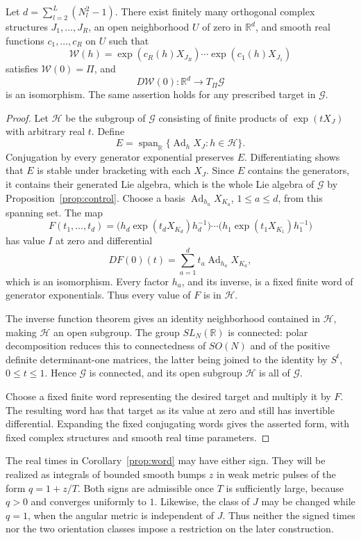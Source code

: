 \begin{corollary}
\label{prop:word}
Let \(d=\sum_{l=2}^L(N_l^2-1)\).
There exist finitely many orthogonal complex structures
\(J_1,\ldots,J_R\), an open neighborhood \(U\) of zero in
\(\mathbb R^d\), and smooth real functions \(c_1,\ldots,c_R\) on
\(U\) such that
\[
 \mathcal W(h)=
   \exp(c_R(h)X_{J_R})\cdots\exp(c_1(h)X_{J_1})
\]
satisfies \(\mathcal W(0)=\Pi\), and
\[
 D\mathcal W(0):\mathbb R^d\longrightarrow T_\Pi\mathcal G
\]
is an isomorphism.  The same assertion holds for any prescribed
target in \(\mathcal G\).
\end{corollary}

\begin{proof}
Let \(\mathcal H\) be the subgroup of \(\mathcal G\) consisting of
finite products of \(\exp(tX_J)\) with arbitrary real \(t\).  Define
\[
 E=\operatorname{span}_{\mathbb R}
       \{\operatorname{Ad}_hX_J:h\in\mathcal H\}.
\]
Conjugation by every generator exponential preserves \(E\).
Differentiating shows that \(E\) is stable under bracketing with
each \(X_J\).  Since \(E\) contains the generators, it contains
their generated Lie algebra, which is the whole Lie algebra of
\(\mathcal G\) by Proposition~\ref{prop:control}.
Choose a basis
\(\operatorname{Ad}_{h_a}X_{K_a}\), \(1\leq a\leq d\), from this
spanning set.  The map
\[
 F(t_1,\ldots,t_d)=
 \bigl(h_d\exp(t_dX_{K_d})h_d^{-1}\bigr)\cdots
 \bigl(h_1\exp(t_1X_{K_1})h_1^{-1}\bigr)
\]
has value \(I\) at zero and differential
\[
 DF(0)(t)=\sum_{a=1}^d t_a\operatorname{Ad}_{h_a}X_{K_a},
\]
which is an isomorphism.  Every factor \(h_a\), and its inverse,
is a fixed finite word of generator exponentials.  Thus every
value of \(F\) is in \(\mathcal H\).

The inverse function theorem gives an identity neighborhood
contained in \(\mathcal H\), making \(\mathcal H\) an open subgroup.
The group \(SL_N(\mathbb R)\) is connected: polar decomposition
reduces this to connectedness of \(SO(N)\) and of the positive
definite determinant-one matrices, the latter being joined to the
identity by \(S^t\), \(0\leq t\leq1\).
Hence \(\mathcal G\) is connected, and its open subgroup
\(\mathcal H\) is all of \(\mathcal G\).

Choose a fixed finite word representing the desired target and
multiply it by \(F\).  The resulting word has that target as its
value at zero and still has invertible differential.  Expanding
the fixed conjugating words gives the asserted form, with fixed
complex structures and smooth real time parameters.
\end{proof}

\begin{remark}
The real times in Corollary~\ref{prop:word} may have either sign.
They will be realized as integrals of bounded smooth bumps \(z\)
in weak metric pulses of the form \(q=1+z/T\).  Both signs are
admissible once \(T\) is sufficiently large, because \(q>0\) and
converges uniformly to \(1\).  Likewise, the class of \(J\) may be
changed while \(q=1\), when the angular metric is independent of
\(J\).  Thus neither the signed times nor the two orientation
classes impose a restriction on the later construction.
\end{remark}
